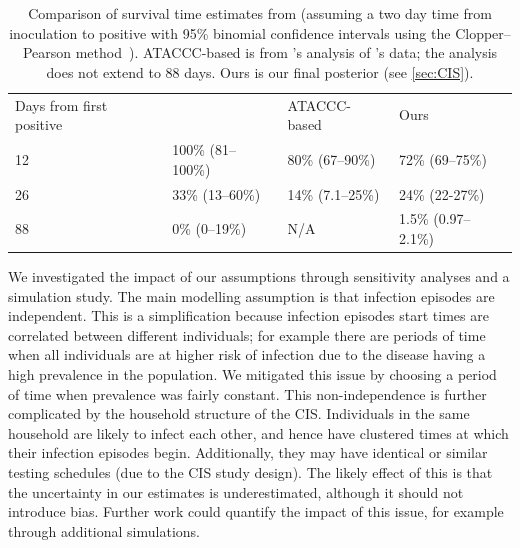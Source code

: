 \documentclass[referee,useAMS,usenatbib]{biom}
\begin{document}
\begin{table}[]
\caption{
    Comparison of survival time estimates from
     (assuming a two day time from inoculation to positive with 95\% binomial confidence intervals using the Clopper--Pearson method~\citep{clopperUse}).
    ATACCC-based is from \citet{blakeThesis}'s analysis of \citet{hakkiOnset}'s data; the analysis does not extend to 88 days.
    Ours is our final posterior (see \cref{sec:CIS}).
}
\centering
\begin{tabular}{llll}
Days from first positive & \citet{killingleySafety}  & ATACCC-based     & Ours                \\
12                       & 100\% (81--100\%) & 80\% (67--90\%)  & 72\% (69--75\%)     \\
26                       & 33\% (13--60\%)   & 14\% (7.1--25\%) & 24\% (22-27\%)      \\
88                       & 0\% (0--19\%)     & N/A              & 1.5\% (0.97--2.1\%)
\end{tabular}
\label{tab:compare-survival}
\end{table}

We investigated the impact of our assumptions through sensitivity analyses and a simulation study.
The main modelling assumption is that infection episodes are independent.
This is a simplification because infection episodes start times are correlated between different individuals; for example there are periods of time when all individuals are at higher risk of infection due to the disease having a high prevalence in the population.
We mitigated this issue by choosing a period of time when prevalence was fairly constant.
This non-independence is further complicated by the household structure of the CIS.
Individuals in the same household are likely to infect each other, and hence have clustered times at which their infection episodes begin.
Additionally, they may have identical or similar testing schedules (due to the CIS study design).
The likely effect of this is that the uncertainty in our estimates is underestimated, although it should not introduce bias.
Further work could quantify the impact of this issue, for example through additional simulations.
\end{document}
